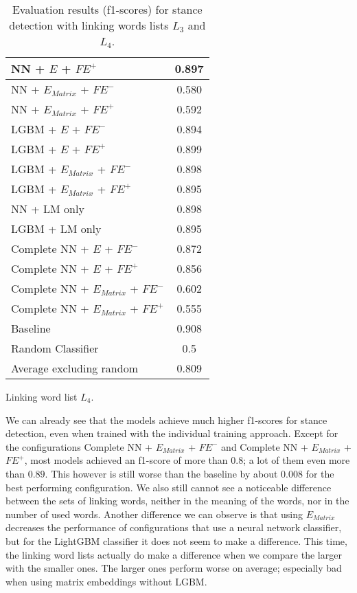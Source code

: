 \begin{table}[H]
\begin{subtable}{.5\textwidth}
\begin{tabular}{|| l || c ||}
 			\hline
 			NN + $E$ + $\textit{FE}^+$ & 0.897 \\
 			\hline
 			NN + $E_{Matrix}$ + $\textit{FE}^-$ & 0.580 \\
 			\hline
 			NN + $E_{Matrix}$ + $\textit{FE}^+$ & 0.592 \\
 			\hline
 			LGBM + $E$ + $\textit{FE}^-$ & 0.894 \\
 			\hline
 			LGBM + $E$ + $\textit{FE}^+$ & 0.899 \\
 			\hline
 			LGBM + $E_{Matrix}$ + $\textit{FE}^-$ & 0.898 \\
 			\hline
 			LGBM + $E_{Matrix}$ + $\textit{FE}^+$ & 0.895 \\
 			\hline
 			NN + LM only & 0.898 \\
 			\hline
 			LGBM + LM only & 0.895 \\
 			\hline
 			Complete NN + $E$ + $\textit{FE}^-$ & 0.872 \\
 			\hline
 			Complete NN + $E$ + $\textit{FE}^+$ & 0.856 \\
 			\hline
 			Complete NN + $E_{Matrix}$ + $\textit{FE}^-$ & 0.602 \\
 			\hline
 			Complete NN + $E_{Matrix}$ + $\textit{FE}^+$ & 0.555 \\
 			\hline
 			Baseline & 0.908 \\
 			\hline
 			Random Classifier & 0.5 \\
 			\hline
 			\hline
 			Average excluding random & 0.809 \\
 			\hline
		\end{tabular}
		\renewcommand{\arraystretch}{1}
  		\caption{Linking word list $L_4$.}%
  	\end{subtable}
  	\caption{Evaluation results (f1-scores) for stance detection with linking words lists $L_3$ and $L_4$.}%
  	\label{fig:stanceresults2}
\end{table}

We can already see that the models achieve much higher f1-scores for stance detection, even when trained with the individual training approach. Except for the configurations Complete NN + $E_{Matrix}$ + $\textit{FE}^-$ and Complete NN + $E_{Matrix}$ + $\textit{FE}^+$, most models achieved an f1-score of more than $0.8$; a lot of them even more than $0.89$. This however is still worse than the baseline by about $0.008$ for the best performing configuration. We also still cannot see a noticeable difference between the sets of linking words, neither in the meaning of the words, nor in the number of used words. Another difference we can observe is that using $E_{Matrix}$ decreases the performance of configurations that use a neural network classifier, but for the LightGBM classifier it does not seem to make a difference. This time, the linking word lists actually do make a difference when we compare the larger with the smaller ones. The larger ones perform worse on average; especially bad when using matrix embeddings without LGBM. \\

